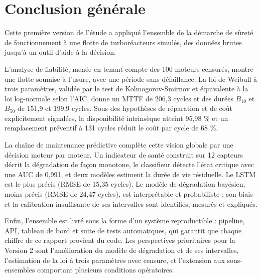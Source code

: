 \chapter*{Conclusion générale}

Cette première version de l'étude a appliqué l'ensemble de la démarche de sûreté de fonctionnement à une flotte de turboréacteurs simulés, des données brutes jusqu'à un outil d'aide à la décision.

L'analyse de fiabilité, menée en tenant compte des 100 moteurs censurés, montre une flotte soumise à l'usure, avec une période sans défaillance. La loi de Weibull à trois paramètres, validée par le test de Kolmogorov-Smirnov et équivalente à la loi log-normale selon l'AIC, donne un MTTF de 206,3 cycles et des durées $B_{10}$ et $B_{50}$ de 151,9 et 199,9 cycles. Sous des hypothèses de réparation et de coût explicitement signalées, la disponibilité intrinsèque atteint 95,98 \% et un remplacement préventif à 131 cycles réduit le coût par cycle de 68 \%.

La chaîne de maintenance prédictive complète cette vision globale par une décision moteur par moteur. Un indicateur de santé construit sur 12 capteurs décrit la dégradation de façon monotone, le classifieur détecte l'état critique avec une AUC de 0,991, et deux modèles estiment la durée de vie résiduelle. Le LSTM est le plus précis (RMSE de 15,35 cycles). Le modèle de dégradation bayésien, moins précis (RMSE de 24,47 cycles), est interprétable et probabiliste ; son biais et la calibration insuffisante de ses intervalles sont identifiés, mesurés et expliqués.

Enfin, l'ensemble est livré sous la forme d'un système reproductible : pipeline, API, tableau de bord et suite de tests automatiques, qui garantit que chaque chiffre de ce rapport provient du code. Les perspectives prioritaires pour la Version 2 sont l'amélioration du modèle de dégradation et de ses intervalles, l'estimation de la loi à trois paramètres avec censure, et l'extension aux sous-ensembles comportant plusieurs conditions opératoires.
